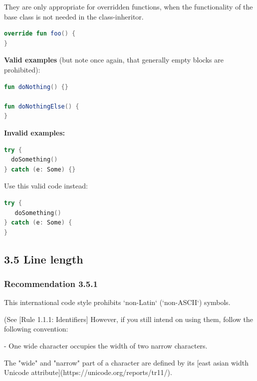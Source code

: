 They are only appropriate for overridden functions, when the functionality of the base class is not needed in the class-inheritor.



\begin{lstlisting}[language=Kotlin]
override fun foo() {
}
\end{lstlisting}


\textbf{Valid examples} (but note once again, that generally empty blocks are prohibited):



\begin{lstlisting}[language=Kotlin]
fun doNothing() {}

fun doNothingElse() {
}
\end{lstlisting}


\textbf{Invalid examples:}

\begin{lstlisting}[language=Kotlin]
try {
  doSomething()
} catch (e: Some) {}
\end{lstlisting}


Use this valid code instead:

\begin{lstlisting}[language=Kotlin]
try {
   doSomething()
} catch (e: Some) {
}
\end{lstlisting}


\subsection*{\textbf{3.5 Line length}}

\subsubsection*{\textbf{Recommendation 3.5.1}}
\leavevmode\newline



This international code style prohibits `non-Latin` (`non-ASCII`) symbols.

(See [Rule 1.1.1: Identifiers] However, if you still intend on using them, follow the following convention:



- One wide character occupies the width of two narrow characters.

The "wide" and "narrow" part of a character are defined by its [east asian width Unicode attribute](https://unicode.org/reports/tr11/).

